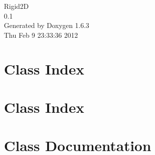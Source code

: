 \documentclass[a4paper]{book}
\begin{document}
\hypersetup{pageanchor=false}
\begin{titlepage}
\vspace*{7cm}
\begin{center}
{\Large Rigid2D \\[1ex]\large 0.1 }\\
\vspace*{1cm}
{\large Generated by Doxygen 1.6.3}\\
\vspace*{0.5cm}
{\small Thu Feb 9 23:33:36 2012}\\
\end{center}
\end{titlepage}
\clearemptydoublepage
{}
\tableofcontents
\clearemptydoublepage
{}
\hypersetup{pageanchor=true}
\chapter{Class Index}

\chapter{Class Index}

\chapter{Class Documentation}
















\printindex
\end{document}
